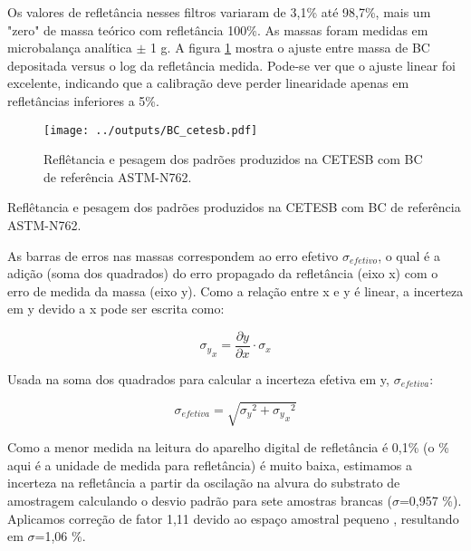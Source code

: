 Os valores de refletância nesses filtros variaram de 3,1\% até 98,7\%, mais um 
"zero" de massa teórico com refletância 100\%. As massas foram medidas em 
microbalança analítica $\pm$ 1 g. A figura \ref{fig:bc_cetesb} mostra o ajuste 
entre massa de BC depositada versus o log da refletância medida. Pode-se ver 
que o ajuste linear foi excelente,
indicando que a calibração deve perder linearidade apenas em refletâncias 
inferiores a 5\%.

\begin{figure}[H]
	\centering
	\texttt{[image: ../outputs/BC\_cetesb.pdf]}
	\caption{Reflêtancia e pesagem dos padrões produzidos na CETESB com BC 
                 de referência ASTM-N762. \label{fig:bc_cetesb}}
\end{figure}

\newpage
\begin{table}[H]
	\centering
	\small
	
	\caption{Reflêtancia e pesagem dos padrões produzidos na CETESB com BC 
                 de referência ASTM-N762. \label{table:bc_cetesb}}
\end{table} 



As barras de erros nas massas correspondem ao erro efetivo $\sigma_{efetivo}$, 
o qual é a adição (soma dos quadrados) do erro propagado da refletância (eixo x)
com o erro de medida da massa (eixo y). Como a relação entre x e y é linear, 
a incerteza em y devido a x pode ser escrita como:

\begin{equation}
  {\sigma_y}_x = \frac{\partial y}{\partial x} \cdot \sigma_x
\end{equation} 

Usada na soma dos quadrados para calcular a incerteza efetiva em y, 
$\sigma_{efetiva}$: 

\begin{equation}
  \sigma_{efetiva} = \sqrt{{\sigma_y}^2 + {{\sigma_y}_x}^2}
\end{equation} 

Como a menor medida na leitura do aparelho digital de refletância é 0,1\%
(o \% aqui é a unidade de medida para refletância) é muito baixa, estimamos 
a incerteza na refletância a partir da oscilação na alvura do substrato de 
amostragem calculando o desvio padrão para sete amostras 
brancas ($\sigma$=0,957 \%). Aplicamos correção de fator 1,11 devido ao 
espaço amostral pequeno \citep{helene1981}, resultando em $\sigma$=1,06 \%.


